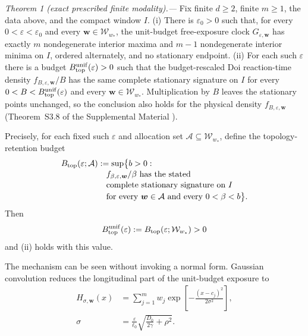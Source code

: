 \documentclass[aps,physrev,reprint,amsmath,amssymb,longbibliography,floatfix]{revtex4-2}
\begin{document}
\medskip
\noindent\textit{Theorem 1 (exact prescribed finite modality).---}
Fix finite $d\ge2$, finite $m\ge1$, the data above, and the compact window
$I$.
(i) There is $\varepsilon_0>0$ such that, for every
$0<\varepsilon<\varepsilon_0$ and every $\bm w\in\mathcal W_{w_*}$, the
unit-budget free-exposure clock $G_{\varepsilon,\bm w}$ has exactly $m$
nondegenerate interior maxima and $m-1$ nondegenerate interior minima on
$I$, ordered alternately, and no stationary endpoint.
(ii) For each such $\varepsilon$ there is a budget
$B_{\rm top}^{\rm unif}(\varepsilon)>0$ such that the budget-rescaled Doi
reaction-time density $f_{B,\varepsilon,\bm w}/B$ has the same complete
stationary signature on $I$ for every
$0<B<B_{\rm top}^{\rm unif}(\varepsilon)$ and every
$\bm w\in\mathcal W_{w_*}$.  Multiplication by $B$ leaves the stationary
points unchanged, so the conclusion also holds for the physical density
$f_{B,\varepsilon,\bm w}$ (Theorem~S3.8 of the Supplemental Material
\cite{supplementalMaterial}).

Precisely, for each fixed such $\varepsilon$ and allocation set
$\mathcal A\subseteq\mathcal W_{w_*}$, define the topology-retention budget
\begin{align}
 B_{\rm top}(\varepsilon;\mathcal A)
 &:=\sup\bigl\{b>0:\nonumber\\[-2pt]
 &\quad f_{\beta,\varepsilon,\bm w}/\beta
 \text{ has the stated}\nonumber\\[-2pt]
 &\quad\text{complete stationary signature on }I
 \nonumber\\[-2pt]
 &\quad\text{for every }\bm w\in\mathcal A
 \text{ and every }0<\beta<b\bigr\}.
 \label{eq:exact-m-btop}
\end{align}
Then
\begin{equation}
 B_{\rm top}^{\rm unif}(\varepsilon)
 :=B_{\rm top}(\varepsilon;\mathcal W_{w_*})>0
 \label{eq:exact-m-btop-unif}
\end{equation}
and (ii) holds with this value.

The mechanism can be seen without invoking a normal form.  Gaussian
convolution reduces the longitudinal part of the unit-budget exposure to
\begin{equation}
 \begin{aligned}
  H_{\sigma,\bm w}(x)
  &=\sum_{j=1}^{m}w_j
    \exp\!\left[-\frac{(x-c_j)^2}{2\sigma^2}\right],\\
  \sigma&=\frac{\varepsilon}{\ell_0}
  \sqrt{\frac{D_0}{2\gamma}+\rho^2}.
 \end{aligned}
 \label{eq:exact-m-mixture}
\end{equation}
\end{document}
